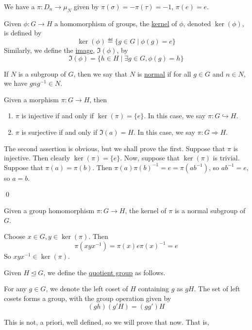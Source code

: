 \documentclass[x11names,reqno,14pt]{extarticle}
\begin{document}
\exm

We have a $\pi:D_n\to\mu_N$ given by $\pi(\sigma)= -\pi(\tau) = -1$, $\pi(e) = e$. 


Given $\phi:G\to H$ a homomorphism of groups, the \underline{kernel} of $\phi$, denoted $\ker(\phi)$, is defined by
\[
\ker(\phi) \eqdef \{g \in G \mid \phi(g) = e \}
\]
Similarly, we define the \underline{image}, $\Im(\phi)$, by 
\[
\Im(\phi) = \{h \in H \mid \exists g \in G, \phi(g) = h \}
\]


If $N$ is a subgroup of $G$, then we say that $N$ is \underline{normal} if for all $g \in G$ and $n \in N$, we have $gng^{-1} \in N$. 

\lem Given a morphism $\pi: G\to H$, then 
\begin{enumerate}
\item $\pi$ is injective if and only if $\ker(\pi) = \{e\}$. In this case, we say $\pi:G\hookrightarrow H$. 
\item $\pi$ is surjective if and only if $\Im(a) = H$. In this case, we say $\pi:G\Rightarrow H$. 
\end{enumerate}

\proof

The second assertion is obvious, but we shall prove the first. Suppose that $\pi$ is injective. Then clearly $\ker(\pi) = \{e\}$. Now, suppose that $\ker(\pi)$ is trivial. Suppose that $\pi(a) = \pi(b)$. Then $\pi(a)\pi(b)^{-1} = e = \pi(ab^{-1})$, so $ab^{-1} = e$, so $a = b$. 

\qed

\prop

Given a group homomorphism $\pi: G\to H$, the kernel of $\pi$ is a normal subgroup of $G$. 

\proof

Choose $x \in G, y \in \ker(\pi)$. Then 
\[
\pi(xyx^{-1}) = \pi(x)e\pi(x)^{-1} = e
\]
So $xyx^{-1} \in \ker(\pi)$. 


Given $H\unlhd G$, we define the \underline{quotient group} as follows. 

For any $g \in G$, we denote the left coset of $H$ containing $g$ as $gH$. The set of left cosets forms a group, with the group operation given by 
\[
(gh)(g'H) = (gg')H
\]

This is not, a priori, well defined, so we will prove that now. That is, 

\lem 
\end{document}
